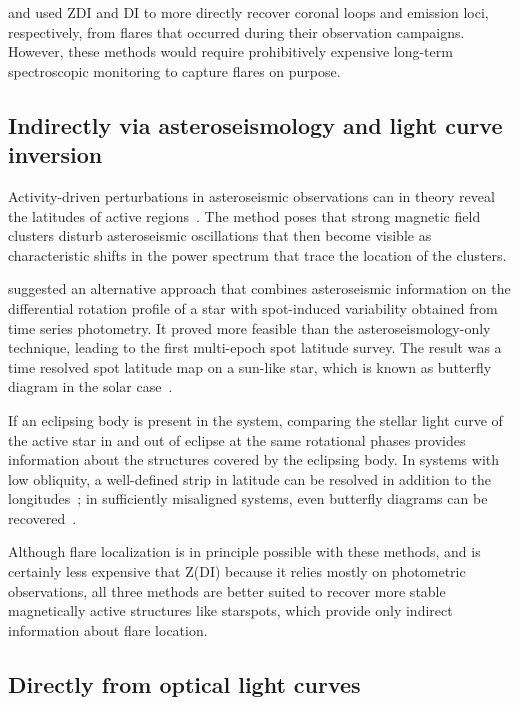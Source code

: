 \documentclass[proof]{WileyASNA-v1}
\begin{document}
\citet{berdyugina2017} and \citet{wolter2008} used ZDI and DI to more directly recover coronal loops and emission loci, respectively, from flares that occurred during their observation campaigns. However, these methods would require prohibitively expensive long-term spectroscopic monitoring to capture flares on purpose.

\subsection{Indirectly via asteroseismology and light curve inversion}

Activity-driven perturbations in asteroseismic observations can in theory reveal the latitudes of active regions~\citep{gizon2002, papini2015, papini2019}. The method poses that strong magnetic field clusters disturb asteroseismic oscillations that then become visible as characteristic shifts in the power spectrum that trace the location of the clusters.

\citet{berdyugina2005} suggested an alternative approach that combines asteroseismic information on the differential rotation profile of a star with spot-induced variability obtained from time series photometry. It proved more feasible than the asteroseismology-only technique, leading to the first multi-epoch spot latitude survey. The result was a time resolved spot latitude map on a sun-like star, which is known as butterfly diagram in the solar case~\citep{bazot2018}.%

If an eclipsing body is present in the system, comparing the stellar light curve of the active star in and out of eclipse at the same rotational phases provides information about the structures covered by the eclipsing body. In systems with low obliquity, a well-defined strip in latitude can be resolved in addition to the longitudes~\citep{huber2009,huber2010}; in sufficiently misaligned systems, even butterfly diagrams can be recovered~\citep{netto2020}. 

Although flare localization is in principle possible with these methods, and is certainly less expensive that Z(DI) because it relies mostly on photometric observations, all three methods are better suited to recover more stable magnetically active structures like starspots, which provide only indirect information about flare location.

\subsection{Directly from optical light curves}
\label{sec:systematic}
\end{document}
